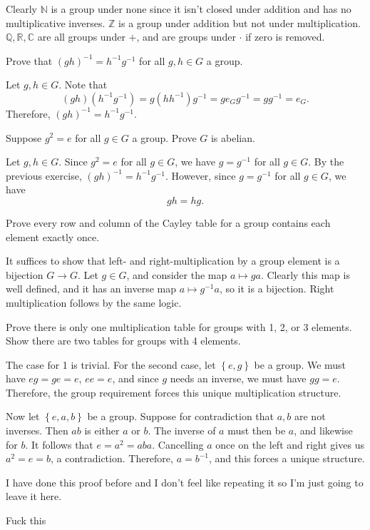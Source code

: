 \documentclass[11pt]{report}
\begin{document}
\begin{solution}
	Clearly $\mathbb{N} $ is a group under none since it isn't closed under addition and has no multiplicative inverses. $\mathbb{Z} $ is a group under addition but not under multiplication. $\mathbb{Q} ,\mathbb{R} ,\mathbb{C} $ are all groups under $+$, and are groups under $\cdot $ if zero is removed.
\end{solution}
\begin{exercise}
	Prove that $(gh)^{-1} =h^{-1} g^{-1} $ for all $g,h\in G$ a group.
\end{exercise}
\begin{solution}
	Let $g,h\in G$. Note that
	\[
		(gh)\left( h^{-1} g^{-1}  \right) =g\left( hh^{-1}  \right) g^{-1} =ge_Gg^{-1} =gg^{-1} =e_G
	.\]
	Therefore, $(gh)^{-1} =h^{-1} g^{-1} $.
\end{solution}
\begin{exercise}
	Suppose $g^2=e$ for all $g\in G$ a group. Prove $G$ is abelian.
\end{exercise}
\begin{solution}
	Let $g,h\in G$. Since $g^2=e$ for all $g\in G$, we have $g=g^{-1} $ for all $g\in G$. By the previous exercise, $(gh)^{-1} =h^{-1} g^{-1} $. However, since $g=g^{-1} $ for all $g\in G$, we have
	\[
		gh=hg
	.\]
\end{solution}
\begin{exercise}
	Prove every row and column of the Cayley table for a group contains each element exactly once.
\end{exercise}
\begin{solution}
	It suffices to show that left- and right-multiplication by a group element is a bijection $G \to G$. Let $g\in G$, and consider the map $a\mapsto ga$. Clearly this map is well defined, and it has an inverse map $a\mapsto g^{-1} a$, so it is a bijection. Right multiplication follows by the same logic.
\end{solution}
\begin{exercise}
	Prove there is only one multiplication table for groups with 1, 2, or 3 elements. Show there are two tables for groups with 4 elements.
\end{exercise}
\begin{solution}
	The case for 1 is trivial. For the second case, let $\left\{ e,g \right\} $ be a group. We must have $eg=ge=e$, $ee=e$, and since $g$ needs an inverse, we must have $gg=e$. Therefore, the group requirement forces this unique multiplication structure.

	Now let $\left\{ e,a,b \right\} $ be a group. Suppose for contradiction that $a,b$ are not inverses. Then $ab$ is either $a$ or $b$. The inverse of $a$ must then be $a$, and likewise for $b$. It follows that $e=a^2=aba$. Cancelling $a$ once on the left and right gives us $a^2=e=b$, a contradiction. Therefore, $a=b^{-1} $, and this forces a unique structure.

	I have done this proof before and I don't feel like repeating it so I'm just going to leave it here.
\end{solution}
Fuck this
\end{document}
